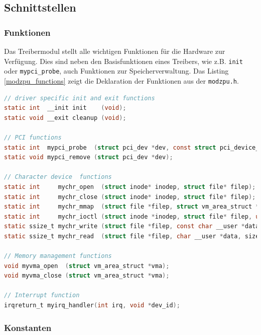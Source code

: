 \documentclass[11pt]{scrartcl}
\begin{document}
\subsection{Schnittstellen}

\subsubsection{Funktionen}

Das Treibermodul stellt alle wichtigen Funktionen für die Hardware zur Verfügung. Dies sind neben den Basisfunktionen eines Treibers, wie z.B. \texttt{init} oder \texttt{mypci\_probe}, auch Funktionen zur Speicherverwaltung. Das Listing \ref{modzpu_functions} zeigt die Deklaration der Funktionen aus der \texttt{modzpu.h}.

\begin{lstlisting}[language=C,firstnumber=47, label=modzpu_functions,caption=Funktionsüberblick des Treibermoduls, float=btp]
// driver specific init and exit functions
static int  __init init    (void);
static void __exit cleanup (void);

// PCI functions
static int  mypci_probe  (struct pci_dev *dev, const struct pci_device_id *id);
static void mypci_remove (struct pci_dev *dev);

// Character device  functions
static int     mychr_open  (struct inode* inodep, struct file* filep);
static int     mychr_close (struct inode* inodep, struct file* filep);
static int     mychr_mmap  (struct file *filep, struct vm_area_struct *vma);
static int     mychr_ioctl (struct inode *inodep, struct file* filep, unsigned int cmd, unsigned long param);
static ssize_t mychr_write (struct file *filep, const char __user *data, size_t count, loff_t *offset);
static ssize_t mychr_read  (struct file *filep, char __user *data, size_t count, loff_t *offset);

// Memory management functions
void myvma_open  (struct vm_area_struct *vma);
void myvma_close (struct vm_area_struct *vma);

// Interrupt function
irqreturn_t myirq_handler(int irq, void *dev_id);
\end{lstlisting}

\subsubsection{Konstanten}
\end{document}
